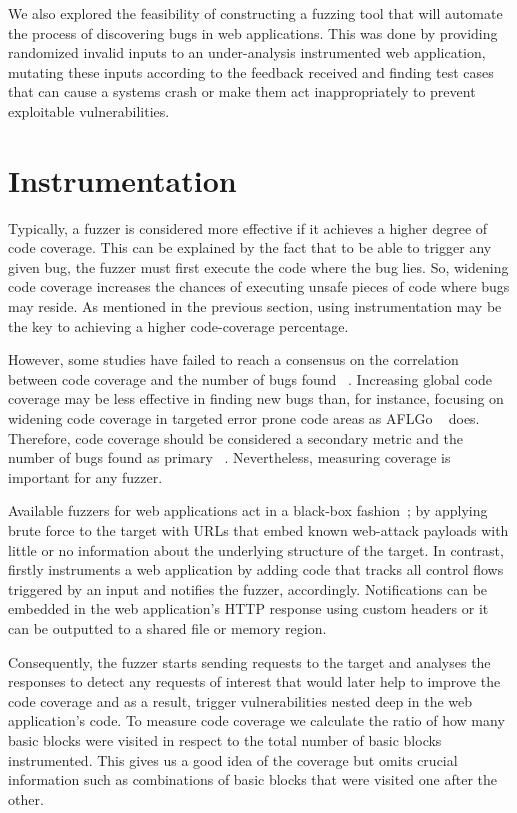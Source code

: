 We also explored the feasibility of constructing a fuzzing tool that will automate the process of discovering bugs in web applications. This was done by providing randomized invalid inputs to an under-analysis instrumented web application, mutating these inputs according to the feedback received and finding test cases that can cause a systems crash or make them act inappropriately to prevent exploitable vulnerabilities.

\section{Instrumentation}
Typically, a fuzzer is considered more effective if it achieves a higher degree of code coverage. This can be explained by the fact that to be able to trigger any given bug, the fuzzer must first execute the code where the bug lies. So, widening code coverage increases the chances of executing unsafe pieces of code where bugs may reside. As mentioned in the previous section, using instrumentation may be the key to achieving a higher code-coverage percentage. 

However, some studies have failed to reach a consensus on the correlation between code coverage and the number of bugs found ~\cite{klees2018Evaluation,coverage2014effectiveness}. 
Increasing global code coverage may be less effective in finding new bugs than, for instance, focusing on widening code coverage in targeted error prone code areas as AFLGo ~\cite{bohme2017directed} does. Therefore, code coverage should be considered a secondary metric and the number of bugs found as primary ~\cite{klees2018Evaluation}. Nevertheless, measuring coverage is important for any fuzzer.

Available fuzzers for web applications act in a black-box fashion~\cite{doupe2010johnny}; by applying brute force to the target with URLs that embed known web-attack payloads with little or no information about the underlying structure of the target. In contrast, \pname firstly instruments a web application by adding code that tracks all control flows triggered by an input and notifies the fuzzer, accordingly. Notifications can be embedded in the web application's HTTP response using custom headers or it can be outputted to a shared file or memory region. 

Consequently, the fuzzer starts sending requests to the target and analyses the responses to detect any requests of interest that would later help to improve the code coverage and as a result, trigger vulnerabilities nested deep in the web application's code. To measure code coverage we calculate the ratio of how many basic blocks were visited in respect to the total number of basic blocks instrumented. This gives us a good idea of the coverage but omits crucial information such as combinations of basic blocks that were visited one after the other.

